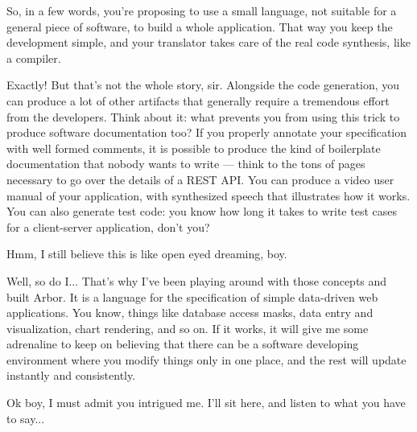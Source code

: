 \documentclass[12pt]{article} %
\newcommand{\ddwa}{data-driven web application}
\newcommand{\A}{Arbor}
\newenvironment{dialogue}{\list{---}{\itemsep=\parskip \topsep=\parskip \parsep=\parskip}}{\endlist}
\begin{document}
\begin{dialogue}
\item So, in a few words, you're proposing to use a small language, not suitable for a general piece of software, to build a whole application. That way you keep the development simple, and your translator takes care of the real code synthesis, like a compiler.
\item Exactly! But that's not the whole story, sir. Alongside the code generation, you can produce a lot of other artifacts that generally require a tremendous effort from the developers. Think about it: what prevents you from using this trick to produce software documentation too? If you properly annotate your specification with well formed comments, it is possible to produce the kind of boilerplate documentation that nobody wants to write --- think to the tons of pages necessary to go over the details of a REST API. You can produce a video user manual of your application, with synthesized speech that illustrates how it works. You can also generate test code: you know how long it takes to write test cases for a client-server application, don't you?
\item Hmm, I still believe this is like open eyed dreaming, boy.
\item Well, so do I... That's why I've been playing around with those concepts and built \A{}. It is a language for the specification of simple \ddwa{}s. You know, things like database access masks, data entry and visualization, chart rendering, and so on. If it works, it will give me some adrenaline to keep on believing that there can be a software developing environment where you modify things only in one place, and the rest will update instantly and consistently.
\item Ok boy, I must admit you intrigued me. I'll sit here, and listen to what you have to say...
\end{dialogue}

\newpage
\end{document}
